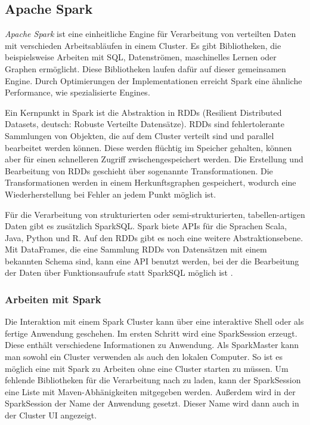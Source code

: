 \subsection{Apache Spark}

\textit{Apache Spark} ist eine einheitliche Engine für Verarbeitung von verteilten Daten mit verschieden Arbeitsabläufen in einem Cluster.
Es gibt Bibliotheken, die beispielsweise Arbeiten mit SQL, Datenströmen, maschinelles Lernen oder Graphen ermöglicht.
Diese Bibliotheken laufen dafür auf dieser gemeinsamen Engine.
Durch Optimierungen der Implementationen erreicht Spark eine ähnliche Performance, wie spezialisierte Engines.

Ein Kernpunkt in Spark ist die Abstraktion in RDDs (Resilient Distributed Datasets, deutsch: Robuste Verteilte Datensätze).
RDDs sind fehlertolerante Sammlungen von Objekten, die auf dem Cluster verteilt sind und parallel bearbeitet werden können.
Diese werden flüchtig im Speicher gehalten, können aber für einen schnelleren Zugriff zwischengespeichert werden.
Die Erstellung und Bearbeitung von RDDs geschieht über sogenannte Transformationen.
Die Transformationen werden in einem Herkunftsgraphen gespeichert, wodurch eine Wiederherstellung bei Fehler an jedem Punkt möglich ist.

Für die Verarbeitung von strukturierten oder semi-strukturierten, tabellen-artigen Daten gibt es zusätzlich SparkSQL.
Spark biete APIs für die Sprachen Scala, Java, Python und R.
Auf den RDDs gibt es noch eine weitere Abstraktionsebene.
Mit DataFrames, die eine Sammlung RDDs von Datensätzen mit einem bekannten Schema sind, kann eine API benutzt werden, bei der die Bearbeitung der Daten über Funktionsaufrufe statt SparkSQL möglich ist \parencite{spark}. 

\subsubsection{Arbeiten mit Spark}

Die Interaktion mit einem Spark Cluster kann über eine interaktive Shell oder als fertige Anwendung geschehen.
Im ersten Schritt wird eine SparkSession erzeugt.
Diese enthält verschiedene Informationen zu Anwendung.
Als SparkMaster kann man sowohl ein Cluster verwenden als auch den lokalen Computer.
So ist es möglich eine mit Spark zu Arbeiten ohne eine Cluster starten zu müssen.
Um fehlende Bibliotheken für die Verarbeitung nach zu laden, kann der SparkSession eine Liste mit Maven-Abhänigkeiten mitgegeben werden.
Außerdem wird in der SparkSession der Name der Anwendung gesetzt.
Dieser Name wird dann auch in der Cluster UI angezeigt.

